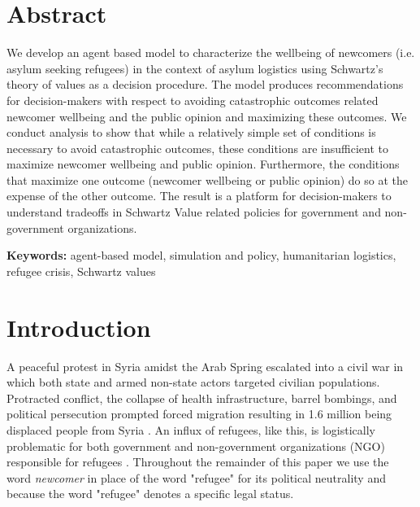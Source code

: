 \documentclass{scspaperproc}
\theoremstyle{scsthe}
\begin{document}
\maketitle

\section*{Abstract}

We develop an agent based model to characterize the wellbeing of newcomers (i.e. asylum seeking refugees) in the context of asylum logistics using Schwartz's theory of values as a decision procedure. The model produces recommendations for decision-makers with respect to avoiding catastrophic outcomes related newcomer wellbeing and the public opinion and maximizing these outcomes. We conduct analysis to show that while a relatively simple set of conditions is necessary to avoid catastrophic outcomes, these conditions are insufficient to maximize newcomer wellbeing and public opinion. Furthermore, the conditions that maximize one outcome (newcomer wellbeing or public opinion) do so at the expense of the other outcome. The result is a platform for decision-makers to understand tradeoffs in Schwartz Value related policies for government and non-government organizations.

\textbf{Keywords:} agent-based model, simulation and policy, humanitarian logistics, refugee crisis, Schwartz values

\section{Introduction}
\label{sec:intro}
A peaceful protest in Syria amidst the Arab Spring escalated into a civil war in which both state and armed non-state actors targeted civilian populations. Protracted conflict, the collapse of health infrastructure, barrel bombings, and political persecution prompted forced migration resulting in 1.6 million being displaced people from Syria \cite{42,90}. An influx of refugees, like this, is logistically problematic for both government and non-government organizations (NGO) responsible for refugees \cite{66}. Throughout the remainder of this paper we use the word \emph{newcomer} in place of the word "refugee" for its political neutrality and because the word "refugee" denotes a specific legal status. 
\end{document}
